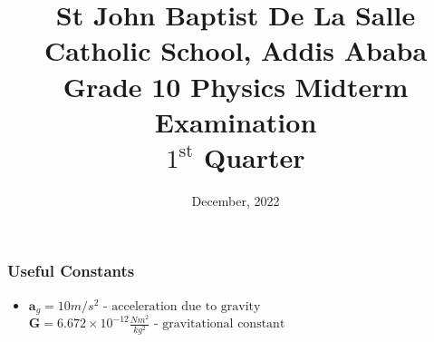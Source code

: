 \documentclass[13pt,addpoints]{exam}
\date{December, 2022}
\begin{document}
	\title{St John Baptist De La Salle Catholic School, Addis Ababa\\
		\large Grade 10 Physics Midterm Examination \\
		$1^\text{st}$ Quarter}
	\maketitle
	\begin{center}
		\subsubsection*{Useful Constants}
	\begin{itemize}
		\item $\textbf{a}_g=10m/s^2\text{  - acceleration due to gravity}$\textbf{~}$\textbf{G} = 6.672\times10^{-12}\frac{Nm^2}{kg^2}\text{  - gravitational constant}$
	\end{itemize}
	
	\end{center}
\end{document}
